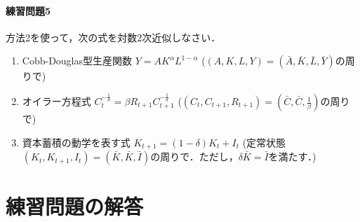 \documentclass[a4paper,12pt,onecolumn,oneside,notitlepage,final]{article}
\begin{document}
\paragraph{練習問題5} 方法2を使って，次の式を対数2次近似しなさい．
\begin{enumerate}
\item Cobb-Douglas型生産関数 $Y = AK^\alpha L^{1-\alpha}$ \quad ($(A,K,L,Y) = (\bar A, \bar K, \bar L, \bar Y)$の周りで)
\item オイラー方程式 $C_t^{-\frac{1}{\sigma}} = \beta R_{t+1} C_{t+1}^{-\frac{1}{\sigma}}$ \quad ($(C_t, C_{t+1}, R_{t+1}) = (\bar C, \bar C, \frac{1}{\beta})$の周りで)
\item 資本蓄積の動学を表す式 $K_{t+1} = (1-\delta) K_t + I_t$ (定常状態 $(K_t, K_{t+1}, I_t) = (\bar K, \bar K, \bar I)$の周りで．ただし，$\delta \bar K = \bar I$を満たす．)
\end{enumerate}

\newpage
\section{練習問題の解答}
\end{document}
